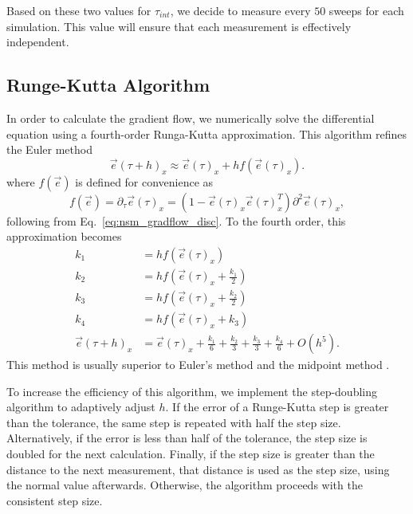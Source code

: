 \documentclass[12pt]{report}
\newcommand{\e}{\vec e}
\begin{document}
Based on these two values for $\tau_{int}$, we decide to measure every $50$ sweeps for each simulation. This value will ensure that each measurement is effectively independent.

\subsection{Runge-Kutta Algorithm}
In order to calculate the gradient flow, we numerically solve the differential equation using a fourth-order Runga-Kutta approximation. This algorithm refines the Euler method 
\begin{equation*}
    \e(\tau+h)_x \approx \e(\tau)_x + h f(\e(\tau)_x).
\end{equation*}
where $f(\e)$ is defined for convenience as 
\begin{equation}
    f(\e)=\partial_\tau \e (\tau)_x  = \left( 1 - \e(\tau)_x \e(\tau)_x^T\right) \partial^2 \e(\tau)_x,
\end{equation}
following from Eq.~\ref{eq:nsm_gradflow_disc}. To the fourth order, this approximation becomes 
%
\begin{align}
    \label{eq:rungekutta}
    k_1 &= h f\left(\e\left(\tau\right)_x\right) \\ 
    k_2 &= h f\left(\e\left(\tau\right)_x + \frac{k_1}{2}\right) \\ 
    k_3 &= h f\left(\e\left(\tau\right)_x + \frac{k_2}{2}\right) \\ 
    k_4 &= h f\left(\e\left(\tau\right)_x + k_3\right) \\ 
    \e(\tau+h)_x &= \e(\tau)_x + \frac{k_1}{6} + \frac{k_2}{3} + \frac{k_3}{3} + \frac{k_4}{6} + O(h^5).
\end{align}
This method is usually superior to Euler's method and the midpoint method \cite{vetterling1992}.

To increase the efficiency of this algorithm, we implement the step-doubling algorithm to adaptively adjust $h$. If the error of a Runge-Kutta step is greater than the tolerance, the same step is repeated with half the step size. Alternatively, if the error is less than half of the tolerance, the step size is doubled for the next calculation. Finally, if the step size is greater than the distance to the next measurement, that distance is used as the step size, using the normal value afterwards. Otherwise, the algorithm proceeds with the consistent step size. 
\end{document}
